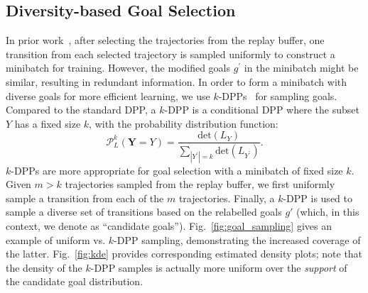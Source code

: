 \subsection{Diversity-based Goal Selection}
In prior work~\cite{NIPS2017_453fadbd,zhao2018energy}, after selecting the trajectories from the replay buffer, one transition from each selected trajectory is sampled uniformly to construct a minibatch for training. However, the modified goals $g^{\prime}$ in the minibatch might be similar, resulting in redundant information. In order to form a minibatch with diverse goals for more efficient learning, we use $k$-DPPs~\cite{kulesza2011k} for sampling goals. Compared to the standard DPP, a $k$-DPP is a conditional DPP where the subset $Y$ has a fixed size $k$, with the probability distribution function:
\begin{equation}
    \mathcal{P}_{L}^{k}(\mathbf{Y}=Y) = \frac{\text{det}(L_{Y})}{\sum_{|Y^{\prime}|=k} \text{det}(L_{Y^{\prime}})}.
\end{equation}
$k$-DPPs are more appropriate for goal selection with a minibatch of fixed size $k$. Given $m > k$ trajectories sampled from the replay buffer, we first uniformly sample a transition from each of the $m$ trajectories. Finally, a $k$-DPP is used to sample a diverse set of transitions based on the relabelled goals $g'$ (which, in this context, we denote as ``candidate goals''). Fig.~\ref{fig:goal_sampling} gives an example of uniform vs. $k$-DPP sampling, demonstrating the increased coverage of the latter. Fig.~\ref{fig:kde} provides corresponding estimated density plots; note that the density of the $k$-DPP samples is actually more uniform over the \textit{support} of the candidate goal distribution.
